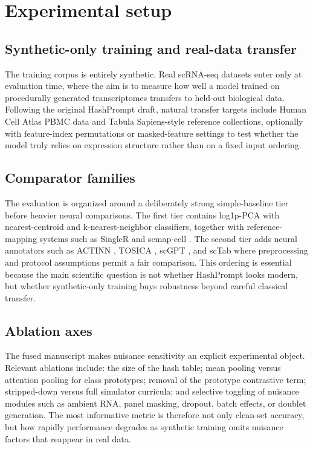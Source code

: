 \documentclass{article}
\begin{document}
\section{Experimental setup}

\subsection{Synthetic-only training and real-data transfer}
The training corpus is entirely synthetic. Real scRNA-seq datasets enter only at evaluation time, where the aim is to measure how well a model trained on procedurally generated transcriptomes transfers to held-out biological data. Following the original HashPrompt draft, natural transfer targets include Human Cell Atlas PBMC data and Tabula Sapiens-style reference collections, optionally with feature-index permutations or masked-feature settings to test whether the model truly relies on expression structure rather than on a fixed input ordering.

\subsection{Comparator families}
The evaluation is organized around a deliberately strong simple-baseline tier before heavier neural comparisons. The first tier contains log1p-PCA with nearest-centroid and k-nearest-neighbor classifiers, together with reference-mapping systems such as SingleR \cite{singleR} and scmap-cell \cite{scmapcell}. The second tier adds neural annotators such as ACTINN \cite{ma2020actinn}, TOSICA \cite{chen2023transformer}, scGPT \cite{cui2024scgpt}, and scTab \cite{fischer2024sctab} where preprocessing and protocol assumptions permit a fair comparison. This ordering is essential because the main scientific question is not whether HashPrompt looks modern, but whether synthetic-only training buys robustness beyond careful classical transfer.

\subsection{Ablation axes}
The fused manuscript makes nuisance sensitivity an explicit experimental object. Relevant ablations include: the size of the hash table; mean pooling versus attention pooling for class prototypes; removal of the prototype contrastive term; stripped-down versus full simulator curricula; and selective toggling of nuisance modules such as ambient RNA, panel masking, dropout, batch effects, or doublet generation. The most informative metric is therefore not only clean-set accuracy, but how rapidly performance degrades as synthetic training omits nuisance factors that reappear in real data.
\end{document}
